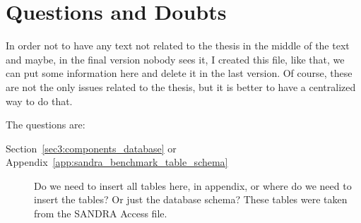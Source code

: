 

\chapter*{Questions and Doubts}
    In order not to have any text not related to the thesis in the middle of the text and maybe, in the final version nobody sees it, I created this file, like that, we can put some information here and delete it in the last version. Of course, these are not the only issues related to the thesis, but it is better to have a centralized way to do that.

    The questions are:
\begin{description}
	\item [Section~\ref{sec3:components_database} or Appendix~\ref{app:sandra_benchmark_table_schema}] Do we need to insert all tables here, in appendix, or where do we need to insert the tables? Or just the database schema? These tables were taken from the SANDRA Access file.
\end{description}
